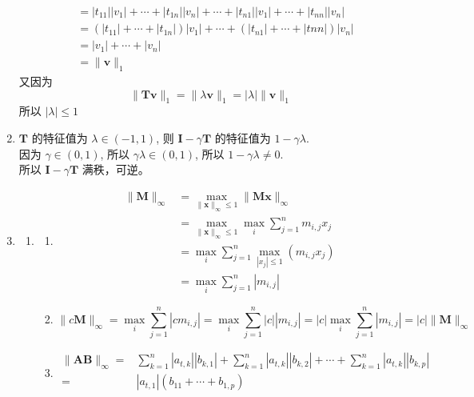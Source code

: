 \documentclass[11pt,letter,notitlepage]{article}
\begin{document}
\begin{solution}
\begin{enumerate}
$$\begin{aligned}
				       & = |t_{11}||v_1|+\cdots+|t_{1n}||v_n| + \cdots +|t_{n1}||v_1|+\cdots+|t_{nn}||v_n|            \\
				       & = (|t_{11}|+\cdots+|t_{1n}|)|v_1|+\cdots +(|t_{n1}|+\cdots+|t{nn}|)|v_n|                     \\
				       & = |v_1|+\cdots +|v_n|                                                                        \\
				       & = \|\mathbf{v}\|_1
			      \end{aligned}$$
		      又因为
		      $$\|\mathbf{T}\mathbf{v}\|_1=\|\lambda \mathbf{v}\|_1=|\lambda| \|\mathbf{v}\|_1$$
		      所以 $|\lambda|\leq 1$
		\item $\mathbf{T}$ 的特征值为 $\lambda\in(-1,1)$, 则 $\mathbf{I}-\gamma\mathbf{T}$ 的特征值为 $1-\gamma\lambda$. \\
		      因为 $\gamma\in(0,1)$, 所以 $\gamma\lambda\in(0,1)$, 所以 $1-\gamma\lambda\neq 0$. \\
		      所以 $\mathbf{I}-\gamma\mathbf{T}$ 满秩，可逆。
		\item \begin{enumerate}
			      \item \begin{enumerate}
				            \item$$\begin{aligned}
						                  \|\mathbf{M}\|_\infty
						                   & =\max_{\|\mathbf{x}\|_\infty\leq1}\|\mathbf{M}\mathbf{x}\|_\infty  \\
						                   & =\max_{\|\mathbf{x}\|_\infty\leq1} \max_i \sum_{j=1}^n m_{i,j} x_j \\
						                   & =\max_i \sum_{j=1}^n \max_{|x_j|\leq1} (m_{i,j} x_j)               \\
						                   & = \max_i \sum_{j=1}^n |m_{i,j}|
					                  \end{aligned}$$ $$$$
				            \item $$\|c\mathbf{M}\|_\infty=\max_i \sum_{j=1}^n |cm_{i,j}|=\max_i \sum_{j=1}^n |c| |m_{i,j}|=|c|\max_i \sum_{j=1}^n |m_{i,j}|=|c|\|\mathbf{M}\|_\infty$$
				            \item $$\begin{aligned}
						                  \|\mathbf{AB}\|_\infty
						                  =    & \sum_{k=1}^n |a_{t,k}||b_{k,1}|+\sum_{k=1}^n |a_{t,k}||b_{k,2}|+\cdots+\sum_{k=1}^n |a_{t,k}||b_{k,p}| \\
						                  =    & |a_{t,1}| (b_{11}+\cdots+b_{1,p})                                                                      \\

\end{aligned}$$
\end{enumerate}
\end{enumerate}
\end{enumerate}
\end{solution}
\end{document}
